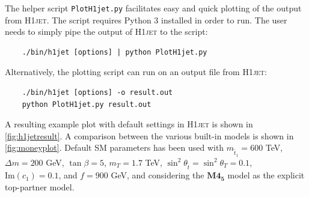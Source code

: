 \documentclass[12pt]{article}
\begin{document}
The helper script \texttt{PlotH1jet.py} facilitates easy and quick
plotting of the output from \textsc{H1jet}. The script requires Python
3 installed in order to run. The user needs to simply pipe the output
of \textsc{H1jet} to the script:
\begin{lstlisting}
	./bin/h1jet [options] | python PlotH1jet.py 
\end{lstlisting}
Alternatively, the plotting script can run on an output file from \textsc{H1jet}: 
\begin{lstlisting}
	./bin/h1jet [options] -o result.out 
	python PlotH1jet.py result.out 
\end{lstlisting}
A resulting example plot with default settings in \textsc{H1jet} is shown in \autoref{fig:h1jetresult}. A comparison between the various built-in models is shown in \autoref{fig:moneyplot}. Default SM parameters has been used with $m_{\tilde{t}_1} = 600$ TeV, $\Delta m = 200$ GeV, $\tan\beta = 5$, $m_T = 1.7$ TeV, $\sin^2\theta_{\tilde{t}} = \sin^2\theta_{T} = 0.1$, $\text{Im}(c_1) = 0.1$, and $f = 900$ GeV, and considering the $\textbf{M4}_{\textbf{5}}$ model as the explicit top-partner model. 

\end{document}
